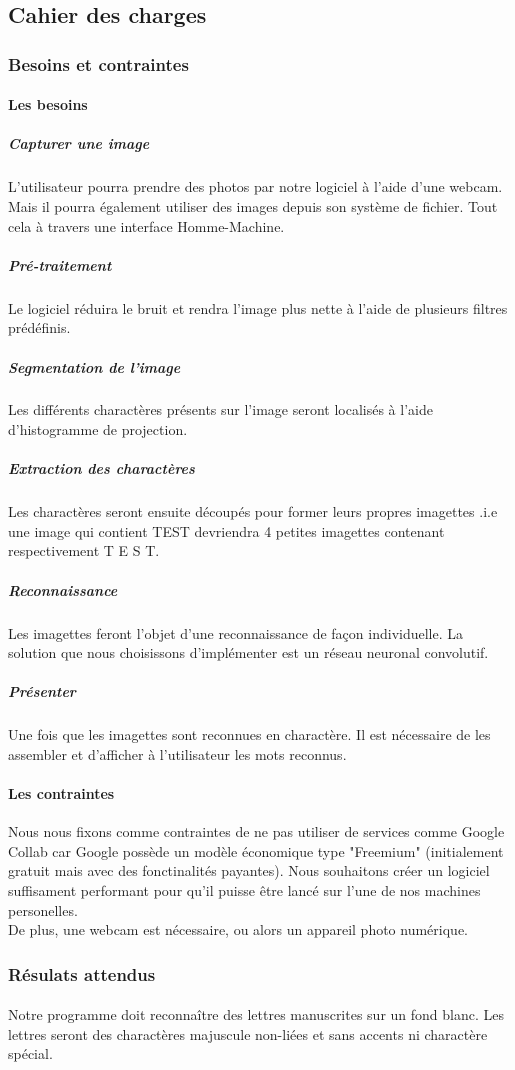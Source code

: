 \documentclass[a4paper]{article}
\begin{document}
		\subsection{Cahier des charges}
			\subsubsection{Besoins et contraintes}
				\paragraph{Les besoins}
					\subparagraph{Capturer une image}
						L'utilisateur pourra prendre des photos par notre logiciel à l'aide d'une webcam. Mais il pourra également utiliser des images depuis son système de fichier. Tout cela à travers une interface Homme-Machine.
					\subparagraph{Pré-traitement}
						Le logiciel réduira le bruit et rendra l'image plus nette à l'aide de plusieurs filtres prédéfinis. 
					\subparagraph{Segmentation de l'image}
						Les différents charactères présents sur l'image seront localisés à l'aide d'histogramme de projection.
					\subparagraph{Extraction des charactères}
						Les charactères seront ensuite découpés pour former leurs propres imagettes .i.e une image qui contient TEST devriendra 4 petites imagettes contenant respectivement T E S T.
					\subparagraph{Reconnaissance}
						Les imagettes feront l'objet d'une reconnaissance de façon individuelle. La solution que nous choisissons d'implémenter est un réseau neuronal convolutif.
					\subparagraph{Présenter}
						Une fois que les imagettes sont reconnues en charactère. Il est nécessaire de les assembler et d'afficher à l'utilisateur les mots reconnus.
				\paragraph{Les contraintes}
					Nous nous fixons comme contraintes de ne pas utiliser de services comme Google Collab car Google possède un modèle économique type "Freemium" (initialement gratuit mais avec des fonctinalités payantes). Nous souhaitons créer un logiciel suffisament performant pour qu'il puisse être lancé sur l'une de nos machines personelles. \\De plus, une webcam est nécessaire, ou alors un appareil photo numérique.
			\subsubsection{Résulats attendus}
				\paragraph{}
					Notre programme doit reconnaître des lettres manuscrites sur un fond blanc. Les lettres seront des charactères majuscule non-liées et sans accents ni charactère spécial.
\end{document}
